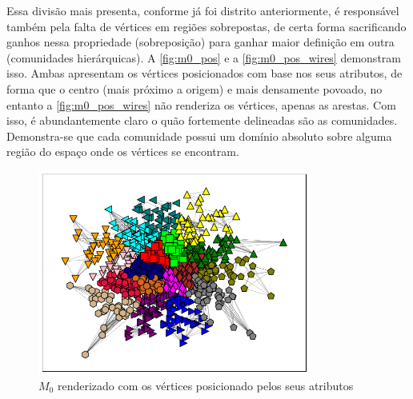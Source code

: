 \documentclass[notes.tex]{subfiles}
\begin{document}
Essa divisão mais presenta, conforme já foi distrito anteriormente, é responsável também pela falta de vértices em regiões sobrepostas, de certa forma sacrificando ganhos nessa propriedade (sobreposição) para ganhar maior definição em outra (comunidades hierárquicas).
A \autoref{fig:m0_pos} e a \autoref{fig:m0_pos_wires} demonstram isso.
Ambas apresentam os vértices posicionados com base nos seus atributos, de forma que o centro (mais próximo a origem) e mais densamente povoado, no entanto a \autoref{fig:m0_pos_wires} não renderiza os vértices, apenas as arestas.
Com isso, é abundantemente claro o quão fortemente delineadas são as comunidades.
Demonstra-se que cada comunidade possui um domínio absoluto sobre alguma região do espaço onde os vértices se encontram.

\begin{figure}[htpb]
    \centering
    \caption{$M_0$ renderizado com os vértices posicionado pelos seus atributos}\label{fig:m0_pos}
    \includegraphics[width=0.8\textwidth, height=0.32\textheight]{figures/m0_pos.png}
\end{figure}
\end{document}
